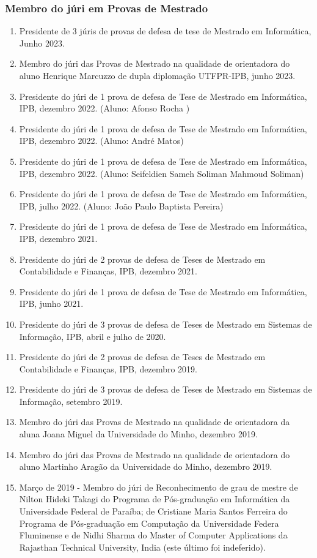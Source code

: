 \documentclass[11pt]{article}
\begin{document}
\subsubsection{Membro do júri em Provas de Mestrado}
\begin{enumerate}
\item {Presidente de 3 júris de provas de defesa de tese de Mestrado em Informática, Junho 2023. }
\item {Membro do júri das Provas de Mestrado na qualidade de orientadora do aluno Henrique Marcuzzo de dupla diplomação UTFPR-IPB, junho 2023.}
\item {Presidente do júri de 1 prova de defesa de Tese de Mestrado em Informática, IPB, dezembro 2022. (Aluno: Afonso Rocha ) }
\item {Presidente do júri de 1 prova de defesa de Tese de Mestrado em Informática, IPB, dezembro 2022. (Aluno: André Matos) }
\item {Presidente do júri de 1 prova de defesa de Tese de Mestrado em Informática, IPB, dezembro 2022. (Aluno: Seifeldien Sameh Soliman Mahmoud Soliman) }
\item {Presidente do júri de 1 prova de defesa de Tese de Mestrado em Informática, IPB, julho 2022. (Aluno: João Paulo Baptista Pereira)}
\item {Presidente do júri de 1 prova de defesa de Tese de Mestrado em Informática, IPB, dezembro 2021.}
\item {Presidente do júri de 2 provas de defesa de Teses de Mestrado em Contabilidade e Finanças, IPB, dezembro 2021.}
\item {Presidente do júri de 1 prova de defesa de Tese de Mestrado em Informática, IPB, junho 2021.}
\item {Presidente do júri de 3 provas de defesa de Teses de Mestrado em Sistemas de Informação, IPB, abril e julho de 2020.}
\item {Presidente do júri de 2 provas de defesa de Teses de Mestrado em Contabilidade e Finanças, IPB, dezembro 2019.}
\item {Presidente do júri de 3 provas de defesa de Teses de Mestrado em Sistemas de Informação, setembro 2019.}
\item {Membro do júri das Provas de Mestrado na qualidade de orientadora da aluna Joana Miguel da Universidade do Minho, dezembro 2019.}
\item {Membro do júri das Provas de Mestrado na qualidade de orientadora do aluno Martinho Aragão da Universidade do Minho, dezembro 2019.}
\item {Março de 2019 - Membro do júri de Reconhecimento de grau de mestre de Nilton Hideki Takagi do Programa de Pós-graduação em Informática da Universidade Federal de Paraíba; de Cristiane Maria Santos Ferreira do Programa de Pós-graduação em Computação da Universidade Federa Fluminense e de Nidhi Sharma do Master of Computer Applications da Rajasthan Technical University, India (este último foi indeferido).}

\end{enumerate}
\end{document}
